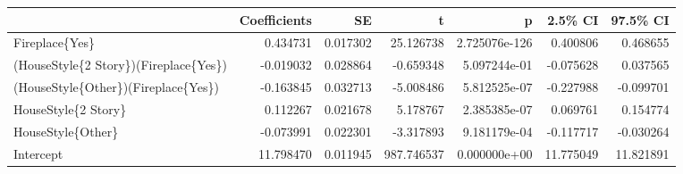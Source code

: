 \begin{tabular}{lrrrrrr}
\toprule
{} &  Coefficients &        SE &           t &              p &    2.5\% CI &   97.5\% CI \\
\midrule
Fireplace\{Yes\}                        &      0.434731 &  0.017302 &   25.126738 &  2.725076e-126 &   0.400806 &   0.468655 \\
(HouseStyle\{2 Story\})(Fireplace\{Yes\}) &     -0.019032 &  0.028864 &   -0.659348 &   5.097244e-01 &  -0.075628 &   0.037565 \\
(HouseStyle\{Other\})(Fireplace\{Yes\})   &     -0.163845 &  0.032713 &   -5.008486 &   5.812525e-07 &  -0.227988 &  -0.099701 \\
HouseStyle\{2 Story\}                   &      0.112267 &  0.021678 &    5.178767 &   2.385385e-07 &   0.069761 &   0.154774 \\
HouseStyle\{Other\}                     &     -0.073991 &  0.022301 &   -3.317893 &   9.181179e-04 &  -0.117717 &  -0.030264 \\
Intercept                             &     11.798470 &  0.011945 &  987.746537 &   0.000000e+00 &  11.775049 &  11.821891 \\
\bottomrule
\end{tabular}
